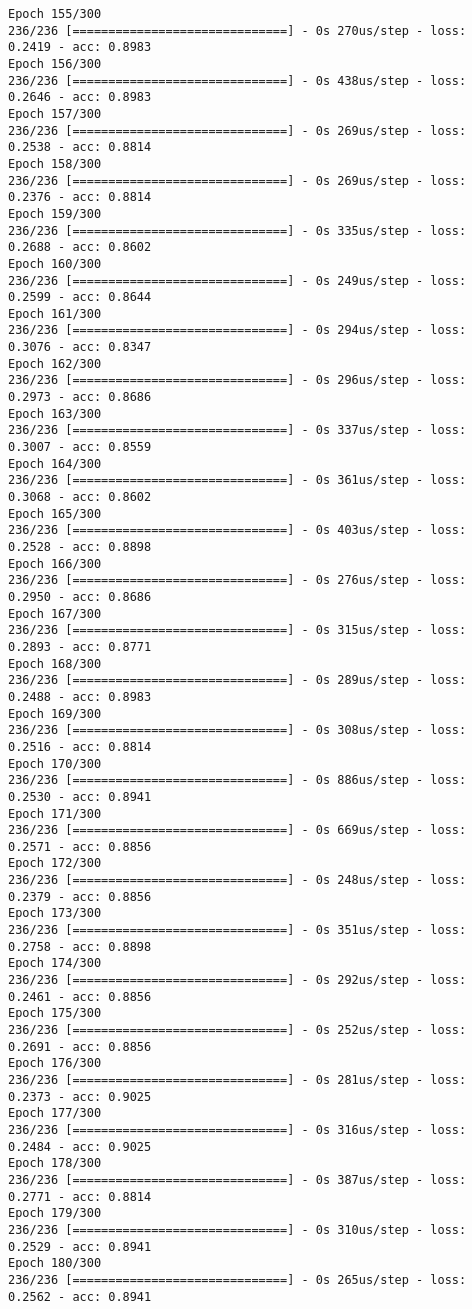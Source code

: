 \documentclass[11pt]{article}
\begin{document}
\begin{Verbatim}[commandchars=\\\{\}]
Epoch 155/300
236/236 [==============================] - 0s 270us/step - loss: 0.2419 - acc: 0.8983
Epoch 156/300
236/236 [==============================] - 0s 438us/step - loss: 0.2646 - acc: 0.8983
Epoch 157/300
236/236 [==============================] - 0s 269us/step - loss: 0.2538 - acc: 0.8814
Epoch 158/300
236/236 [==============================] - 0s 269us/step - loss: 0.2376 - acc: 0.8814
Epoch 159/300
236/236 [==============================] - 0s 335us/step - loss: 0.2688 - acc: 0.8602
Epoch 160/300
236/236 [==============================] - 0s 249us/step - loss: 0.2599 - acc: 0.8644
Epoch 161/300
236/236 [==============================] - 0s 294us/step - loss: 0.3076 - acc: 0.8347
Epoch 162/300
236/236 [==============================] - 0s 296us/step - loss: 0.2973 - acc: 0.8686
Epoch 163/300
236/236 [==============================] - 0s 337us/step - loss: 0.3007 - acc: 0.8559
Epoch 164/300
236/236 [==============================] - 0s 361us/step - loss: 0.3068 - acc: 0.8602
Epoch 165/300
236/236 [==============================] - 0s 403us/step - loss: 0.2528 - acc: 0.8898
Epoch 166/300
236/236 [==============================] - 0s 276us/step - loss: 0.2950 - acc: 0.8686
Epoch 167/300
236/236 [==============================] - 0s 315us/step - loss: 0.2893 - acc: 0.8771
Epoch 168/300
236/236 [==============================] - 0s 289us/step - loss: 0.2488 - acc: 0.8983
Epoch 169/300
236/236 [==============================] - 0s 308us/step - loss: 0.2516 - acc: 0.8814
Epoch 170/300
236/236 [==============================] - 0s 886us/step - loss: 0.2530 - acc: 0.8941
Epoch 171/300
236/236 [==============================] - 0s 669us/step - loss: 0.2571 - acc: 0.8856
Epoch 172/300
236/236 [==============================] - 0s 248us/step - loss: 0.2379 - acc: 0.8856
Epoch 173/300
236/236 [==============================] - 0s 351us/step - loss: 0.2758 - acc: 0.8898
Epoch 174/300
236/236 [==============================] - 0s 292us/step - loss: 0.2461 - acc: 0.8856
Epoch 175/300
236/236 [==============================] - 0s 252us/step - loss: 0.2691 - acc: 0.8856
Epoch 176/300
236/236 [==============================] - 0s 281us/step - loss: 0.2373 - acc: 0.9025
Epoch 177/300
236/236 [==============================] - 0s 316us/step - loss: 0.2484 - acc: 0.9025
Epoch 178/300
236/236 [==============================] - 0s 387us/step - loss: 0.2771 - acc: 0.8814
Epoch 179/300
236/236 [==============================] - 0s 310us/step - loss: 0.2529 - acc: 0.8941
Epoch 180/300
236/236 [==============================] - 0s 265us/step - loss: 0.2562 - acc: 0.8941

\end{Verbatim}
\end{document}

